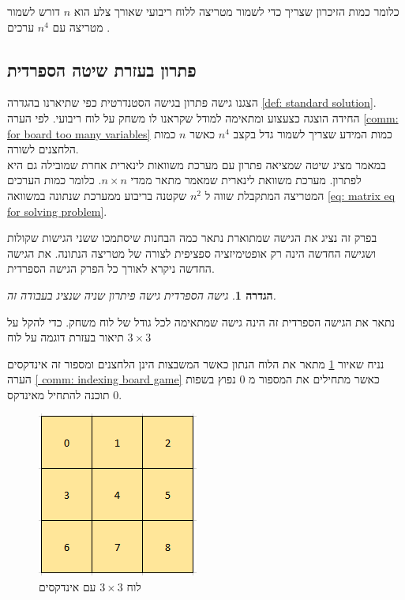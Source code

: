 \documentclass[12pt,twoside]{article}
\newtheorem{definition}{הגדרה}[section]
\begin{document}
כלומר כמות הזיכרון שצריך כדי לשמור מטריצה ללוח ריבועי שאורך צלע הוא
$n$
דורש לשמור מטריצה עם 
$n^4$
ערכים
.


\subsection{פתרון בעזרת שיטה הספרדית}
הצגנו גישה פתרון
בגישה הסטנדרטית 
כפי שתיארנו
בהגדרה
\ref{def: standard solution}.
\\
החידה הוצגה כצעצוע ומתאימה למודל שקראנו לו משחק על לוח ריבועי.
לפי הערה 
\ref{comm: for board too many variables}
כמות המידע שצריך לשמור גדל בקצב 
$n^4$
כאשר
$n$
כמות הלחצנים לשורה.
\\
במאמר 
\cite{B1}
מציג שיטה שמציאה פתרון עם מערכת משוואות לינארית אחרת שמובילה גם היא לפתרון.
מערכת משוואת לינארית שמאמר 
\cite{B1}
מתאר ממדי
$n \times n $.
כלומר כמות הערכים המטריצה המתקבלת שווה
ל
$n^2$
שקטנה בריבוע
ממערכת 
שנתונה במשוואה
\ref{eq: matrix eq for solving problem}.

בפרק זה נציג את הגישה שמתוארת 
\cite{B1}
נתאר כמה הבחנות שיסתמכו ששני הגישות שקולות ושגישה החדשה הינה רק אופטימיזציה
ספציפית לצורה של מטריצה הנתונה.
את הגישה החדשה ניקרא לאורך כל הפרק הגישה הספרדית.

\begin{definition}
    \label{def: spanish way}
    גישה הספרדית גישה פיתרון שניה שנציג בעבודה זה.
\end{definition}

נתאר את הגישה הספרדית 
זה הינה גישה שמתאימה לכל גודל של לוח משחק.
כדי להקל על תיאור 
בעזרת דוגמה על לוח 
$3 \times 3$

נניח שאיור 
\ref{fig: 3 x 3 board indexed}
מתאר את הלוח הנתון כאשר המשבצות הינן הלחצנים ומספור זה אינדקסים הערה 
\ref{ comm: indexing board game}
כאשר מתחילים את המספור מ
$0$
נפוץ בשפות תוכנה להתחיל מאינדקס 
$0$.

\begin{figure}[ht]
    \caption{לוח 
    $3 \times 3$
    עם אינדקסים}
    \label{fig: 3 x 3 board indexed}
    \unsethebrew
    \centering
    \includegraphics[width=.3\textwidth,height=.3\textheight,keepaspectratio]{images/3x3_board_index.PNG}
\end{figure}
\sethebrew
\end{document}
